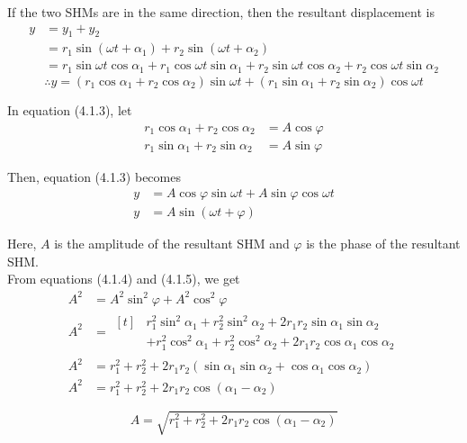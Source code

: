 \documentclass[12pt]{article}
\numberwithin{equation}{subsection}
\begin{document}
If the two SHMs are in the same direction, then the resultant displacement is
\begin{align*}
    y &= y_1 + y_2 \\
    &= r_1 \sin{(\omega t + \alpha_1)} + r_2 \sin{(\omega t + \alpha_2)} \\
    &= r_1 \sin{\omega t} \cos{\alpha_1} + r_1 \cos{\omega t} \sin{\alpha_1} + r_2 \sin{\omega t} \cos{\alpha_2} + r_2 \cos{\omega t} \sin{\alpha_2}
\end{align*}
\begin{equation}
    \therefore y = (r_1 \cos{\alpha_1} + r_2 \cos{\alpha_2}) \sin{\omega t} + (r_1 \sin{\alpha_1} + r_2 \sin{\alpha_2}) \cos{\omega t}
\end{equation}

In equation (4.1.3), let
\begin{align}
    r_1\cos{\alpha_1} + r_2\cos{\alpha_2} &= A\cos{\varphi} \\
    r_1\sin{\alpha_1} + r_2\sin{\alpha_2} &= A\sin{\varphi}
\end{align}

Then, equation (4.1.3) becomes
\begin{align}
    y &= A\cos{\varphi} \sin{\omega t} + A\sin{\varphi} \cos{\omega t} \\
    y &= A \sin{(\omega t + \varphi)}
\end{align}

Here, $A$ is the amplitude of the resultant SHM and $\varphi$ is the phase of the resultant SHM. \\

From equations (4.1.4) and (4.1.5), we get
\begin{align*}
    A^2 &= A^2 \sin^2{\varphi} + A^2 \cos^2{\varphi} \\
    A^2 &= 
    \begin{aligned}[t]
        & r_1^2 \sin^2{\alpha_1} + r_2^2 \sin^2{\alpha_2} + 2r_1r_2 \sin{\alpha_1} \sin{\alpha_2} \\
            & + r_1^2 \cos^2{\alpha_1} + r_2^2 \cos^2{\alpha_2} + 2r_1r_2 \cos{\alpha_1} \cos{\alpha_2}
    \end{aligned}\\
    A^2 &= r_1^2 + r_2^2 + 2r_1r_2(\sin{\alpha_1} \sin{\alpha_2} + \cos{\alpha_1} \cos{\alpha_2}) \\
    A^2 &= r_1^2 + r_2^2 + 2r_1r_2 \cos{(\alpha_1 - \alpha_2)}
\end{align*}

\begin{equation}
    \boxed{ A = \sqrt{r_1^2 + r_2^2 + 2r_1r_2 \cos{(\alpha_1 - \alpha_2)}} }
\end{equation}
\end{document}
